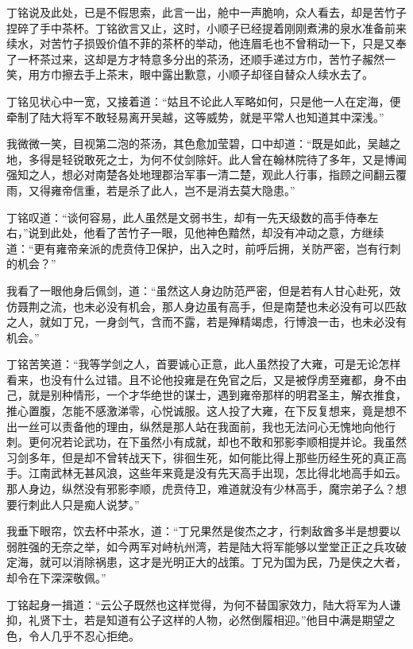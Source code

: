丁铭说及此处，已是不假思索，此言一出，舱中一声脆响，众人看去，却是苦竹子捏碎了手中茶杯。丁铭欲言又止，这时，小顺子已经提着刚刚煮沸的泉水准备前来续水，对苦竹子损毁价值不菲的茶杯的举动，他连眉毛也不曾稍动一下，只是又奉了一杯茶过来，这却是方才特意多分出的茶汤，还顺手递过方巾，苦竹子赧然一笑，用方巾擦去手上茶末，眼中露出歉意，小顺子却径自替众人续水去了。

丁铭见状心中一宽，又接着道：“姑且不论此人军略如何，只是他一人在定海，便牵制了陆大将军不敢轻易离开吴越，这等威势，就是平常人也知道其中深浅。”

我微微一笑，目视第二泡的茶汤，其色愈加莹碧，口中却道：“既是如此，吴越之地，多得是轻锐敢死之士，为何不仗剑除奸。此人曾在翰林院待了多年，又是博闻强知之人，想必对南楚各处地理郡治军事一清二楚，观此人行事，指顾之间翻云覆雨，又得雍帝信重，若是杀了此人，岂不是消去莫大隐患。”

丁铭叹道：“谈何容易，此人虽然是文弱书生，却有一先天级数的高手侍奉左右，”说到此处，他看了苦竹子一眼，见他神色黯然，却没有冲动之意，方继续道：“更有雍帝亲派的虎贲侍卫保护，出入之时，前呼后拥，关防严密，岂有行刺的机会？”

我看了一眼他身后佩剑，道：“虽然这人身边防范严密，但是若有人甘心赴死，效仿聂荆之流，也未必没有机会，那人身边虽有高手，但是南楚也未必没有可以匹敌之人，就如丁兄，一身剑气，含而不露，若是殚精竭虑，行博浪一击，也未必没有机会。”

丁铭苦笑道：“我等学剑之人，首要诚心正意，此人虽然投了大雍，可是无论怎样看来，也没有什么过错。且不论他投雍是在免官之后，又是被俘虏至雍都，身不由己，就是别种情形，一个才华绝世的谋士，遇到雍帝那样的明君圣主，解衣推食，推心置腹，怎能不感激涕零，心悦诚服。这人投了大雍，在下反复想来，竟是想不出一丝可以责备他的理由，纵然是那人站在我面前，我也无法问心无愧地向他行刺。更何况若论武功，在下虽然小有成就，却也不敢和邪影李顺相提并论。我虽然习剑多年，但是却不曾转战天下，徘徊生死，如何能比得上那些历经生死的真正高手。江南武林无甚风浪，这些年来竟是没有先天高手出现，怎比得北地高手如云。那人身边，纵然没有邪影李顺，虎贲侍卫，难道就没有少林高手，魔宗弟子么？想要行刺此人只是痴人说梦。”

我垂下眼帘，饮去杯中茶水，道：“丁兄果然是俊杰之才，行刺敌酋多半是想要以弱胜强的无奈之举，如今两军对峙杭州湾，若是陆大将军能够以堂堂正正之兵攻破定海，就可以消除祸患，这才是光明正大的战策。丁兄为国为民，乃是侠之大者，却令在下深深敬佩。”

丁铭起身一揖道：“云公子既然也这样觉得，为何不替国家效力，陆大将军为人谦抑，礼贤下士，若是知道有公子这样的人物，必然倒履相迎。”他目中满是期望之色，令人几乎不忍心拒绝。

